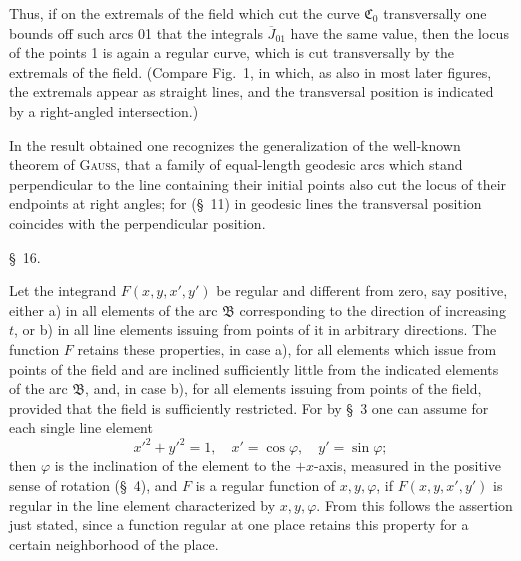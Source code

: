 \documentclass[11pt,a4paper,leqno]{article}
\begin{document}
Thus, if on the extremals of the field which cut the curve $\mathfrak{C}_0$ transversally one bounds off such arcs 01 that the integrals $\overline{J}_{01}$ have the same value, then the locus of the points 1 is again a regular curve, which is cut transversally by the extremals of the field. (Compare Fig.~1, in which, as also in most later figures, the extremals appear as straight lines, and the transversal position is indicated by a right-angled intersection.)

In the result obtained one recognizes the generalization of the well-known theorem of \textsc{Gauss}, that a family of equal-length geodesic arcs which stand perpendicular to the line containing their initial points
also cut the locus of their endpoints at right angles; for (\S~11) in geodesic lines the transversal position coincides with the perpendicular position.

\begin{center}{\large \S~16.}\end{center}

Let the integrand $F(x,y,x',y')$ be regular and different from zero, say positive, either a) in all elements of the arc $\mathfrak{B}$ corresponding to the direction of increasing $t$, or b) in all line elements issuing from points of it in arbitrary directions. The function $F$ retains these properties, in case a), for all elements which issue from points of the field and are inclined sufficiently little from the indicated elements of the arc $\mathfrak{B}$, and, in case b), for all elements issuing from points of the field, provided that the field is sufficiently restricted. For by \S~3 one can assume for each single line element
\[
x'^2+y'^2=1,
\quad x'=\cos\varphi,
\quad y'=\sin\varphi;
\]
then $\varphi$ is the inclination of the element to the $+x$-axis, measured in the positive sense of rotation (\S~4), and $F$ is a regular function of $x,y,\varphi$, if $F(x,y,x',y')$ is regular in the line element characterized by $x,y,\varphi$. From this follows the assertion just stated, since a function regular at one place retains this property for a certain neighborhood of the place.
\end{document}
